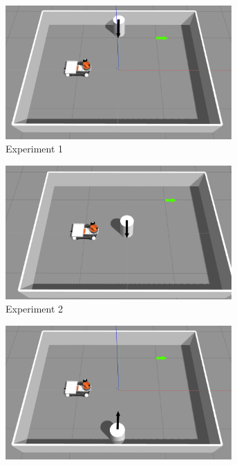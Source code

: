 \begin{figure}[H]
    \centering
    \begin{subfigure}[b]{0.50\linewidth}
        \centering
        \includegraphics[width=0.95\textwidth]{images/test_case_1/exp1.png}
        \caption{Experiment 1}
    \end{subfigure}%
    \begin{subfigure}[b]{0.50\linewidth}
        \centering
        \includegraphics[width=0.95\textwidth]{images/test_case_1/exp2.png}
        \caption{Experiment 2}
    \end{subfigure}
    \begin{subfigure}[b]{0.50\linewidth}
        \centering
        \includegraphics[width=0.95\textwidth]{images/test_case_1/exp3.png}

\end{subfigure}
\end{figure}

